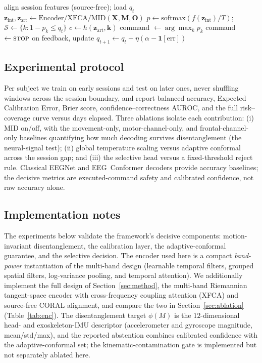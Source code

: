 \documentclass[journal]{IEEEtran}
\begin{document}
\begin{algorithm}[t]
\caption{CALM-Net deployment on session $s$ (per window)}
\label{alg:deploy}
\begin{algorithmic}[1]
\State align session features (source-free); load $q_t$
\State $\mathbf{z}_{\mathrm{int}},\mathbf{z}_{\mathrm{art}}\leftarrow \mathrm{Encoder/XFCA/MID}(\mathbf{X},\mathbf{M},\mathbf{O})$
\State $p\leftarrow \mathrm{softmax}(f(\mathbf{z}_{\mathrm{int}})/T)$;\quad
       $\mathcal{S}\leftarrow\{k:1-p_k\le q_t\}$
\State $c\leftarrow h(\mathbf{z}_{\mathrm{art}},\mathbf{k})$
   \State command $\leftarrow \arg\max_k p_k$
\Else
   \State command $\leftarrow \textsc{stop}$ 
\EndIf
\State on feedback, update $q_{t+1}\leftarrow q_t+\eta(\alpha-\mathbf{1}[\text{err}])$
\end{algorithmic}
\end{algorithm}

\subsection{Experimental protocol}
Per subject we train on early sessions and test on later ones, never shuffling
windows across the session boundary, and report balanced accuracy, Expected
Calibration Error, Brier score, confidence--correctness AUROC, and the full
risk--coverage curve versus days elapsed. Three ablations isolate each contribution:
(i) MID on/off, with the movement-only, motor-channel-only, and frontal-channel-only
baselines quantifying how much decoding survives disentanglement (the neural-signal
test); (ii) global temperature scaling versus adaptive conformal across the session
gap; and (iii) the selective head versus a fixed-threshold reject rule. Classical
EEGNet and EEG~Conformer decoders provide accuracy baselines; the decisive metrics
are executed-command safety and calibrated confidence, not raw accuracy alone.

\subsection{Implementation notes}
The experiments below validate the framework's decisive components: motion-invariant
disentanglement, the calibration layer, the adaptive-conformal guarantee, and the
selective decision. The encoder used here is a compact \emph{band-power}
instantiation of the multi-band design (learnable temporal filters, grouped spatial
filters, log-variance pooling, and temporal attention). We additionally implement the
full design of Section~\ref{sec:method}, the multi-band Riemannian tangent-space
encoder with cross-frequency coupling attention (XFCA) and source-free CORAL
alignment, and compare the two in Section~\ref{sec:ablation}
(Table~\ref{tab:enc}). The disentanglement target $\phi(M)$ is the $12$-dimensional head- and
exoskeleton-IMU descriptor (accelerometer and gyroscope magnitude, mean/std/max), and
the reported abstention combines calibrated confidence with the adaptive-conformal
set; the kinematic-contamination gate is implemented but not separately ablated here.
\end{document}
